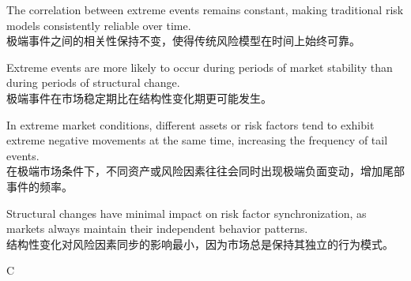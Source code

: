 \documentclass{article}
\begin{document}
\begin{choices}
   
\item The correlation between extreme events remains constant, making traditional risk models consistently reliable over time. \\
极端事件之间的相关性保持不变，使得传统风险模型在时间上始终可靠。

\item Extreme events are more likely to occur during periods of market stability than during periods of structural change. \\
极端事件在市场稳定期比在结构性变化期更可能发生。

\item In extreme market conditions, different assets or risk factors tend to exhibit extreme negative movements at the same time, increasing the frequency of tail events. \\
在极端市场条件下，不同资产或风险因素往往会同时出现极端负面变动，增加尾部事件的频率。

\item Structural changes have minimal impact on risk factor synchronization, as markets always maintain their independent behavior patterns. \\
结构性变化对风险因素同步的影响最小，因为市场总是保持其独立的行为模式。

\end{choices}

\begin{correctanswer}
    C
\end{correctanswer}
\end{document}
